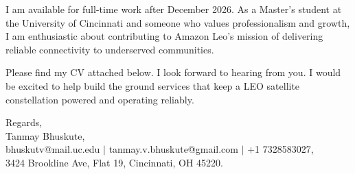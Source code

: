 \documentclass[11pt]{letter}
\begin{document}
\begin{letter}{}
I am available for full-time work after December 2026. As a Master's student at the University of Cincinnati and someone who values professionalism and growth, I am enthusiastic about contributing to Amazon Leo's mission of delivering reliable connectivity to underserved communities.

Please find my CV attached below. I look forward to hearing from you. I would be excited to help build the ground services that keep a LEO satellite constellation powered and operating reliably.

{\setlength{\parskip}{0pt}
Regards,\\
Tanmay Bhuskute,\\
bhuskutv@mail.uc.edu $\mid$ tanmay.v.bhuskute@gmail.com $\mid$ +1 7328583027,\\
3424 Brookline Ave, Flat 19, Cincinnati, OH 45220.
}

\end{letter}
\end{document}
